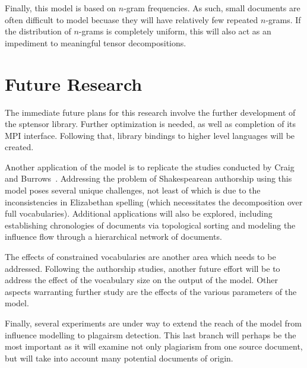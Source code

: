\documentclass[../ut-dissertation.tex]{subfiles}
\begin{document}
Finally, this model is based on $n$-gram
frequencies.  As such, small documents are often difficult to model
becuase they will have relatively few repeated $n$-grams.  If the
distribution of $n$-grams is completely  uniform, this will also act
as an impediment to meaningful tensor decompositions.

\section{Future Research}
The immediate future plans for this research involve the further
development of the sptensor library.  Further optimization is needed,
as well as completion of its MPI interface.  Following that, library
bindings to higher level languages will be created.

Another application of the model is to replicate the studies conducted
by Craig and Burrows~\cite{burrows2017, craig2009}.  Addressing the
problem of Shakespearean authorship using this model poses several
unique challenges, not least of which is due to the inconsistencies in
Elizabethan spelling (which necessitates the decomposition over full
vocabularies).  Additional applications will also be explored,
including establishing chronologies of documents via topological
sorting and modeling the influence flow through a hierarchical network
of documents.

The effects of constrained vocabularies are another area which needs
to be addressed.  Following the authorship studies, another future
effort will be to address the effect of the vocabulary size on the
output of the model.  Other aspects warranting further study are the
effects of the various parameters of the model.

Finally, several experiments are under way to extend the reach of the
model from influence modelling to plagairsm detection.  This last
branch will perhaps be the most important as it will examine not only
plagiarism from one source document, but will take into account many
potential documents of origin.
\end{document}
